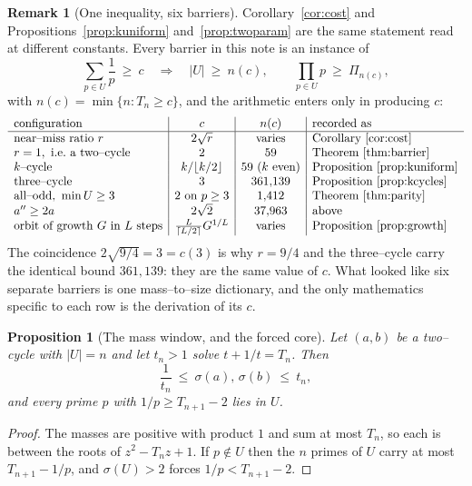 \documentclass[11pt]{article}
\newtheorem{proposition}[theorem]{Proposition}
\theoremstyle{definition}
\newtheorem{remark}[theorem]{Remark}
\begin{document}
\begin{remark}[One inequality, six barriers]\label{rem:dictionary}
Corollary~\ref{cor:cost} and Propositions~\ref{prop:kuniform} and~\ref{prop:twoparam} are the same
statement read at different constants. Every barrier in this note is an instance of
\[ \sum_{p\in U}\frac1p\ \ge\ c \quad\Longrightarrow\quad |U|\ \ge\ n(c),\qquad \prod_{p\in U}p\ \ge\
\Pi_{n(c)}, \]
with $n(c)=\min\{n:T_n\ge c\}$, and the arithmetic enters only in producing $c$:
\[
\begin{array}{l|c|c|l}
\text{configuration} & c & n(c) & \text{recorded as}\\\hline
\text{near--miss ratio }r & 2\sqrt r & \text{varies} & \text{Corollary~\ref{cor:cost}}\\
r=1,\ \text{i.e.\ a two--cycle} & 2 & 59 & \text{Theorem~\ref{thm:barrier}}\\
k\text{--cycle} & k/\lfloor k/2\rfloor & 59\ (k\text{ even}) & \text{Proposition~\ref{prop:kuniform}}\\
\text{three--cycle} & 3 & 361{,}139 & \text{Proposition~\ref{prop:kcycles}}\\
\text{all--odd, }\min U\ge3 & 2\ \text{on }p\ge3 & 1{,}412 & \text{Theorem~\ref{thm:parity}}\\
a''\ge2a & 2\sqrt2 & 37{,}963 & \text{above}\\
\text{orbit of growth }G\text{ in }L\text{ steps} & \tfrac{L}{\lceil L/2\rceil}G^{1/L} &
 \text{varies} & \text{Proposition~\ref{prop:growth}}
\end{array}
\]
The coincidence $2\sqrt{9/4}=3=c(3)$ is why $r=9/4$ and the three--cycle carry the identical bound
$361{,}139$: they are the same value of $c$. What looked like six separate barriers is one
mass--to--size dictionary, and the only mathematics specific to each row is the derivation of its
$c$.
\end{remark}

\begin{proposition}[The mass window, and the forced core]\label{prop:window}
Let $(a,b)$ be a two--cycle with $|U|=n$ and let $t_n>1$ solve $t+1/t=T_n$. Then
\[ \frac1{t_n}\ \le\ \sigma(a),\,\sigma(b)\ \le\ t_n, \]
and every prime $p$ with $1/p\ge T_{n+1}-2$ lies in $U$.
\end{proposition}
\begin{proof}
The masses are positive with product $1$ and sum at most $T_n$, so each is between the roots of
$z^2-T_nz+1$. If $p\notin U$ then the $n$ primes of $U$ carry at most $T_{n+1}-1/p$, and
$\sigma(U)>2$ forces $1/p<T_{n+1}-2$.
\end{proof}
\end{document}

